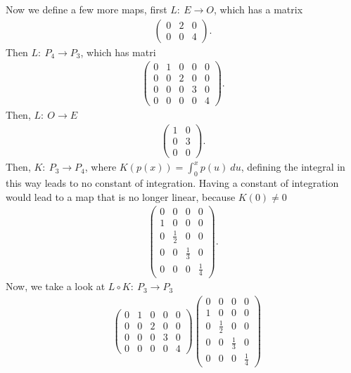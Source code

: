 \documentclass{report}
\begin{document}
\begin{itemize}
            \bigbreak \noindent 
            Now we define a few more maps, first $L:\ E \to O$, which has a matrix
            \begin{align*}
                \begin{pmatrix}
                    0 & 2 & 0 \\ 0 & 0 & 4
                \end{pmatrix}
            .\end{align*}
            Then $L:\ P_{4} \to P_{3}$, which has matri
            \begin{align*}
                \begin{pmatrix}
                    0 & 1 & 0 & 0 & 0 \\ 0 & 0 & 2 & 0 & 0 \\ 0 & 0&0&3 & 0 \\ 0 & 0 & 0 & 0 & 4
                \end{pmatrix}
            .\end{align*}
            Then, $L:\ O \to E $
            \begin{align*}
                \begin{pmatrix}
                    1 & 0 \\ 0 & 3 \\ 0 & 0 
                \end{pmatrix}
            .\end{align*}
            Then, $K:\ P_{3} \to P_{4}$, where $K(p(x)) = \int_{0}^{x}p(u)\ du$, defining the integral in this way leads to no constant of integration. Having a constant of integration would lead to a map that is no longer linear, because $K(0) \ne 0$
            \begin{align*}
                \begin{pmatrix}
                    0 & 0 & 0 & 0\\ 1 & 0 & 0 & 0\\ 0 & \frac{1}{2} & 0 & 0 \\ 0 & 0 &  \frac{1}{3} & 0 \\ 0 & 0 & 0 & \frac{1}{4}
                \end{pmatrix}
            .\end{align*}
            \bigbreak \noindent 
            Now, we take a look at $L \circ K:\ P_{3} \to P_{3}$
            \begin{align*}
                &\begin{pmatrix} 0 & 1 & 0 & 0 & 0 \\ 0 & 0 & 2 & 0 & 0 \\ 0 & 0&0&3 & 0 \\ 0 & 0 & 0 & 0 & 4 \end{pmatrix} \begin{pmatrix} 0 & 0 & 0 & 0\\ 1 & 0 & 0 & 0\\ 0 & \frac{1}{2} & 0 & 0 \\ 0 & 0 &  \frac{1}{3} & 0 \\ 0 & 0 & 0 & \frac{1}{4} \end{pmatrix} \\

\end{align*}
\end{itemize}
\end{document}
